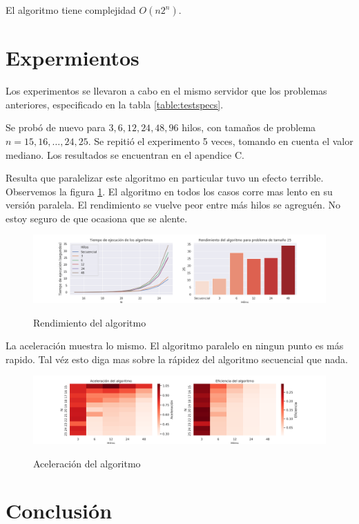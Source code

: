 \documentclass{report}
\begin{document}
El algoritmo tiene complejidad $O(n2^n)$.

\section{Expermientos}

Los experimentos se llevaron a cabo en el mismo servidor que los problemas
anteriores, especificado en la tabla \ref{table:testspecs}.

Se probó de nuevo para $3, 6, 12, 24, 48, 96$ hilos, con tamaños de problema
$n = 15, 16, \ldots, 24, 25$. Se repitió el experimento 5 veces, tomando en cuenta
el valor mediano. Los resultados se encuentran en el apendice C.

Resulta que paralelizar este algoritmo en particular tuvo un efecto terrible.
Observemos la figura \ref{fig:powersetperf}. El algoritmo en todos los casos
corre mas lento en su versión paralela. El rendimiento se vuelve peor entre más
hilos se agreguén. No estoy seguro de que ocasiona que se alente.

\begin{figure}[H]
    \centering
    \caption{Rendimiento del algoritmo}
  \includegraphics[width=\textwidth]{powerset-perf}
\label{fig:powersetperf}
\end{figure}

La aceleración muestra lo mismo. El algoritmo paralelo en ningun punto es más
rapido. Tal véz esto diga mas sobre la rápidez del algoritmo secuencial que nada.

\begin{figure}[H]
    \centering
    \caption{Aceleración del algoritmo}
  \includegraphics[width=\textwidth]{powerset-accel}
\label{fig:powersetaccel}
\end{figure}

\section{Conclusión}
\end{document}
